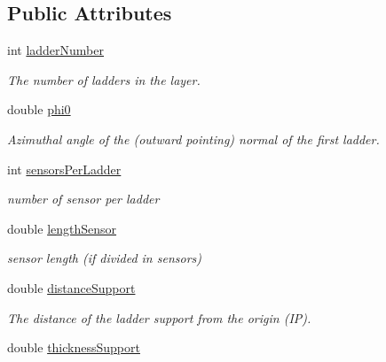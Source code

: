 \subsection*{Public Attributes}
\begin{DoxyCompactItemize}
\item 
int \hyperlink{struct_d_d4hep_1_1_d_d_rec_1_1_z_planar_struct_1_1_layer_layout_ae351fc83c681934cc2bd3b9032224392}{ladderNumber}
\begin{DoxyCompactList}\small\item\em The number of ladders in the layer. \item\end{DoxyCompactList}\item 
double \hyperlink{struct_d_d4hep_1_1_d_d_rec_1_1_z_planar_struct_1_1_layer_layout_ab8c82da52f15d64226f8ef416194f97a}{phi0}
\begin{DoxyCompactList}\small\item\em Azimuthal angle of the (outward pointing) normal of the first ladder. \item\end{DoxyCompactList}\item 
int \hyperlink{struct_d_d4hep_1_1_d_d_rec_1_1_z_planar_struct_1_1_layer_layout_a8dae7b7f1795d92d7edca6571933ee00}{sensorsPerLadder}
\begin{DoxyCompactList}\small\item\em number of sensor per ladder \item\end{DoxyCompactList}\item 
double \hyperlink{struct_d_d4hep_1_1_d_d_rec_1_1_z_planar_struct_1_1_layer_layout_a9ad59213381cec4c5f5bfb7c8a5e8763}{lengthSensor}
\begin{DoxyCompactList}\small\item\em sensor length (if divided in sensors) \item\end{DoxyCompactList}\item 
double \hyperlink{struct_d_d4hep_1_1_d_d_rec_1_1_z_planar_struct_1_1_layer_layout_ad8dd683017ec90bd4663b66fce126208}{distanceSupport}
\begin{DoxyCompactList}\small\item\em The distance of the ladder support from the origin (IP). \item\end{DoxyCompactList}\item 
double \hyperlink{struct_d_d4hep_1_1_d_d_rec_1_1_z_planar_struct_1_1_layer_layout_ad5631fa2c5ffb8e75433a14045b4db90}{thicknessSupport}

\end{DoxyCompactItemize}
